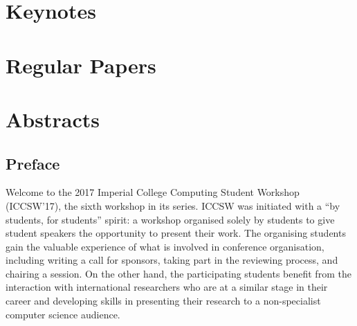 \documentclass[a4paper,UKenglish]{oasicsmaster-v2016}
\begin{document}
\begin{contentslist}





\part{Keynotes}


\part{Regular Papers}


\part{Abstracts}


\end{contentslist}



\chapter{Preface} %

Welcome to the 2017 Imperial College Computing Student Workshop (ICCSW’17), the sixth workshop in its series. ICCSW was initiated with a “by students, for students” spirit: a workshop organised solely by students to give student speakers the opportunity to present their work. The organising students gain
the valuable experience of what is involved in conference organisation, including writing a call for sponsors, taking part in the reviewing process, and chairing a session. On the other hand, the participating students benefit from the interaction with international researchers who are at a similar stage in their career and developing skills in presenting their research to a non-specialist computer science audience.
\end{document}

